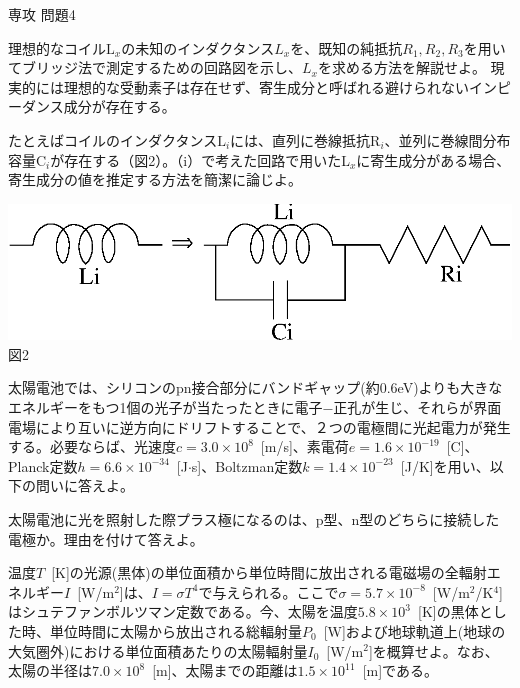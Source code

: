 \documentclass[fleqn]{jbook}
\begin{document}
\begin{question}{専攻 問題4}{}
\begin{subquestions}
\begin{subsubquestions}
\SubSubQuestion
理想的なコイル$\mathrm{L}_{x}$の未知のインダクタンス$L_{x}$を、既知の純抵抗$R_{1},R_{2},R_{3}$を用いてブリッジ法で測定するための回路図を示し、$L_{x}$を求める方法を解説せよ。
\SubSubQuestion
現実的には理想的な受動素子は存在せず、寄生成分と呼ばれる避けられないインピーダンス成分が存在する。
\begin{minipage}{.5\linewidth}
たとえばコイルのインダクタンス$\mathrm{L}_{i}$には、直列に巻線抵抗R${}_{i}$、並列に巻線間分布容量C${}_{i}$が存在する（図2）。（i）で考えた回路で用いたL${}_{x}$に寄生成分がある場合、寄生成分の値を推定する方法を簡潔に論じよ。
\end{minipage}
\hspace*{.05\linewidth}
\begin{minipage}{.45\linewidth}
\begin{center}
\includegraphics[clip,width=\linewidth]{1999phy4-2.eps}\\
図2
\end{center}
\end{minipage}
\end{subsubquestions}

\SubQuestion
太陽電池では、シリコンのpn接合部分にバンドギャップ(約0.6eV)よりも大きなエネルギーをもつ1個の光子が当たったときに電子−正孔が生じ、それらが界面電場により互いに逆方向にドリフトすることで、２つの電極間に光起電力が発生する。必要ならば、光速度$c=3.0\times 10^{8}$~[m/s]、素電荷$e=1.6\times 10^{-19}$~[C]、Planck定数$h=6.6\times 10^{-34}$~[J$\cdot$s]、Boltzman定数$k=1.4\times 10^{-23}$~[J/K]を用い、以下の問いに答えよ。

\begin{subsubquestions}
\SubSubQuestion
太陽電池に光を照射した際プラス極になるのは、p型、n型のどちらに接続した電極か。理由を付けて答えよ。

\SubSubQuestion
温度$T$~[K]の光源(黒体)の単位面積から単位時間に放出される電磁場の全輻射エネルギー$I$~[W/m${}^{2}$]は、$I=\sigma T^{4}$で与えられる。ここで$\sigma =5.7\times 10^{-8}$~[W/m${}^{2}$/K${}^{4}$]はシュテファンボルツマン定数である。今、太陽を温度$5.8\times 10^{3}$~[K]の黒体とした時、単位時間に太陽から放出される総輻射量$P_{0}$~[W]および地球軌道上(地球の大気圏外)における単位面積あたりの太陽輻射量$I_{0}$~[W/m${}^{2}$]を概算せよ。なお、太陽の半径は$7.0\times 10^{8}$~[m]、太陽までの距離は$1.5\times 10^{11}$~[m]である。


\end{subsubquestions}
\end{subquestions}
\end{question}
\end{document}
